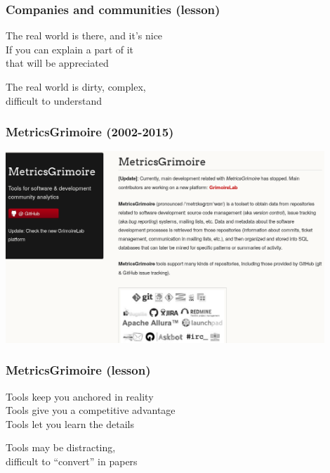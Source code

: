 \documentclass[17pt,aspectratio=169,hyperref=pdfusetitle]{beamer}
\begin{document}
\begin{frame}[fragile]
  \frametitle{Companies and communities (lesson)}

  The real world is there, and it's nice \\
  If you can explain a part of it \\
  that will be appreciated \\
  
  \begin{center}
    The real world is dirty, complex, \\
    difficult to understand \\
  \end{center}  
  
\end{frame}

\begin{frame}[fragile]
  \frametitle{MetricsGrimoire (2002-2015)}

  \begin{center}
  \includegraphics[width=12cm]{figs/metricsgrimoire}
  \end{center}  
  
\end{frame}

\begin{frame}[fragile]
  \frametitle{MetricsGrimoire (lesson)}

  Tools keep you anchored in reality \\
  Tools give you a competitive advantage \\
  Tools let you learn the details \\
  
  \begin{center}
    Tools may be distracting, \\
    difficult to ``convert'' in papers \\
  \end{center}  
  
\end{frame}
\end{document}
